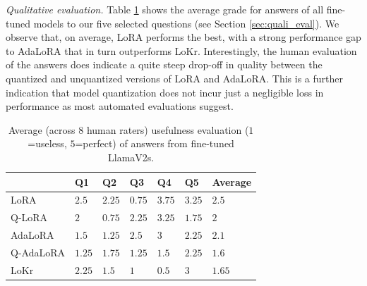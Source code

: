 \documentclass[conference]{IEEEtran}
\begin{document}
%
%


\emph{Qualitative evaluation.}
Table \ref{tbl:qualy_finetuned} shows the average grade for answers of all fine-tuned models to our five selected questions (see Section \ref{sec:quali_eval}). We observe that, on average, LoRA performs the best, with a strong performance gap to AdaLoRA that in turn outperforms LoKr. Interestingly, the human evaluation of the answers does indicate a quite steep drop-off in quality between the quantized and unquantized versions of LoRA and AdaLoRA. This is a further indication that model quantization does not incur just a negligible loss in performance as most automated evaluations suggest.

\begin{table}
\centering
\caption{Average (across $8$ human raters) usefulness evaluation ($1$=useless, $5$=perfect) of answers from fine-tuned LlamaV2s.}
\label{tbl:qualy_finetuned}
\begin{tabular}{lllllll}
         & Q1  & Q2  & Q3  & Q4   & Q5  & Average \\ \hline
LoRA     & $2.5$  & $2.25$ & $0.75$ & $3.75$ & $3.25$ & $2.5$     \\
Q-LoRA    & $2$    & $0.75$ & $2.25$ & $3.25$ & $1.75$ & $2$       \\
AdaLoRA  & $1.5$  & $1.25$ & $2.5$  & $3$    & $2.25$ & $2.1$     \\
Q-AdaLoRA & $1.25$ & $1.75$ & $1.25$ & $1.5$  & $2.25$ & $1.6$     \\
LoKr     & $2.25$ & $1.5$  & $1$    & $0.5$  & $3$    & $1.65$    \\ 
\hline
\end{tabular}
\end{table}
\end{document}
